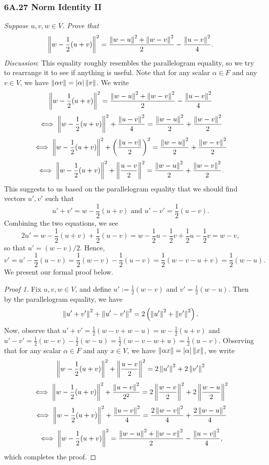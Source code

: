 \documentclass{article}
\begin{document}
\subsubsection*{6A.27 Norm Identity II}
\textit{Suppose $u, v, w\in V$. Prove that}
\begin{equation}\label{parallelogram}
\left\Vert w - \frac 12(u+v)\right\Vert^2 =\frac{\left\Vert w-u\right\Vert^2 + \left\Vert w-v\right\Vert^2}2 - \frac{\left\Vert u-v\right\Vert^2}4.
\end{equation}
\textit{Discussion}: This equality roughly resembles the parallelogram equality, so we try to rearrange it to see if anything is useful. Note that for any scalar $\alpha\in F$ and any $v\in V$, we have $\left\Vert \alpha v\right\Vert = |\alpha|\left\Vert v\right\Vert$. We write
$$\left\Vert w - \frac 12(u+v)\right\Vert^2 =\frac{\left\Vert w-u\right\Vert^2 + \left\Vert w-v\right\Vert^2}2 - \frac{\left\Vert u-v\right\Vert^2}4$$
$$\iff \left\Vert w - \frac 12(u+v)\right\Vert^2 + \frac{\left\Vert u-v\right\Vert^2}{4}= \frac{\left\Vert w-u\right\Vert^2}2+ \frac{\left\Vert w-v\right\Vert^2}2$$
$$\iff \left\Vert w - \frac 12(u+v)\right\Vert^2 + \left(\frac{\left\Vert u-v\right\Vert}{2} \right)^2 =\frac{\left\Vert w-u\right\Vert^2}2+ \frac{\left\Vert w-v\right\Vert^2}2$$
$$\iff \left\Vert w - \frac 12(u+v)\right\Vert^2 + \left\Vert \frac{u-v}2\right\Vert^2 = \frac{\left\Vert w-u\right\Vert^2}2+ \frac{\left\Vert w-v\right\Vert^2}2.$$
This suggests to us based on the parallelogram equality that we should find vectors $u', v'$ such that
$$u' + v' = w - \frac 12(u+v) \textrm{ and } u' - v' = \frac 12 (u-v).$$
Combining the two equations, we see
$$2u' = w - \frac 12(u+v) + \frac 12(u-v) = w - \frac 12u - \frac 12v + \frac 12u - \frac 12v = w-v,$$
so that $u' = (w-v)/2$. Hence,
$$v' = u'- \frac 12(u-v) = \frac 12(w-v) - \frac 12(u-v) = \frac 12(w-v-u+v) = \frac 12(w-u).$$
We present our formal proof below.
\begin{proof}[Proof 1]
Fix $u,v,w\in V$, and define $u':= \frac 12(w-v)$ and $v' = \frac 12(w-u)$. Then by the parallelogram equality, we have
$$\left\Vert u'+v'\right\Vert^2 + \left\Vert u'-v'\right\Vert^2 = 2\left(\left\Vert u'\right\Vert^2 + \left\Vert v'\right\Vert^2 \right).$$
Now, observe that $u' + v' = \frac 12(w-v + w-u)= w - \frac 12(u+v)$ and $u' - v' = \frac 12(w-v) - \frac 12(w-u) = \frac 12(w - v - w+u) = \frac 12(u-v)$. Observing that for any scalar $\alpha\in F$ and any $x\in V$, we have $\left\Vert \alpha x\right\Vert = |\alpha|\left\Vert x\right\Vert$, we write
$$\left\Vert w - \frac 12(u+v)\right\Vert^2 + \left\Vert \frac{u-v}2\right\Vert^2 = 2\left\Vert u'\right\Vert^2 + 2\left\Vert v'\right\Vert^2$$
$$\iff \left\Vert w - \frac 12(u+v)\right\Vert^2 + \frac{\left\Vert u-v\right\Vert^2}{2^2} = 2\left\Vert \frac{w-v}2\right\Vert^2 + 2\left\Vert \frac{w-u}2\right\Vert^2$$
$$\iff \left\Vert w - \frac 12(u+v)\right\Vert^2 + \frac{\left\Vert u-v\right\Vert^2}4 = \frac{2\left\Vert w-v\right\Vert^2}4 + \frac{2\left\Vert w-u\right\Vert^2}4$$
$$\iff \left\Vert w-\frac 12(u+v)\right\Vert^2 = \frac{\left\Vert w-u\right\Vert^2 + \left\Vert w-v\right\Vert^2}{2} - \frac{\left\Vert u-v\right\Vert^2}4,$$
which completes the proof.
\end{proof}
\end{document}
